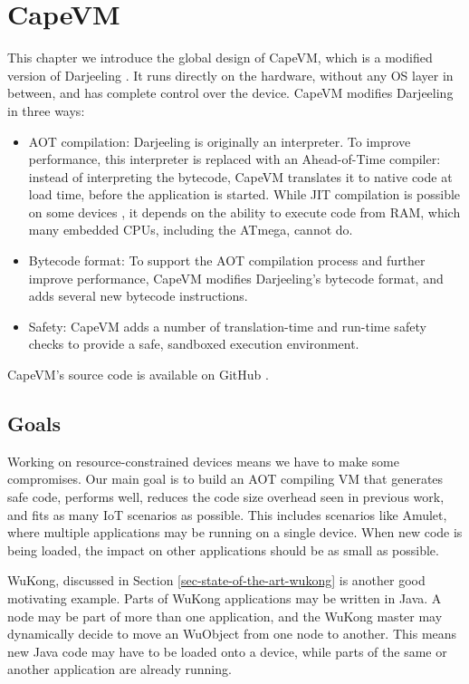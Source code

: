 \chapter{CapeVM}

This chapter we introduce the global design of CapeVM, which is a modified version of Darjeeling \cite{Brouwers:2009cj}. It runs directly on the hardware, without any OS layer in between, and has complete control over the device. CapeVM modifies Darjeeling in three ways:
\begin{itemize}
    \item AOT compilation: Darjeeling is originally an interpreter. To improve performance, this interpreter is replaced with an Ahead-of-Time compiler: instead of interpreting the bytecode, CapeVM translates it to native code at load time, before the application is started. While JIT compilation is possible on some devices \cite{Ellul:2012thesis}, it depends on the ability to execute code from RAM, which many embedded CPUs, including the ATmega, cannot do.
    \item Bytecode format: To support the AOT compilation process and further improve performance, CapeVM modifies Darjeeling's bytecode format, and adds several new bytecode instructions.
    \item Safety: CapeVM adds a number of translation-time and run-time safety checks to provide a safe, sandboxed execution environment.
\end{itemize}

\noindent CapeVM's source code is available on GitHub \cite{capevmsource}.

\section{Goals}
\label{sec-CapeVM-goals}
Working on resource-constrained devices means we have to make some compromises. Our main goal is to build an AOT compiling VM that generates safe code, performs well, reduces the code size overhead seen in previous work, and fits as many IoT scenarios as possible. This includes scenarios like Amulet, where multiple applications may be running on a single device. When new code is being loaded, the impact on other applications should be as small as possible.

WuKong, discussed in Section \ref{sec-state-of-the-art-wukong} is another good motivating example. Parts of WuKong applications may be written in Java. A node may be part of more than one application, and the WuKong master may dynamically decide to move an WuObject from one node to another. This means new Java code may have to be loaded onto a device, while parts of the same or another application are already running.

